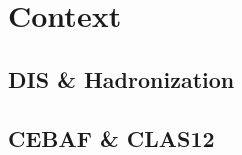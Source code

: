 \section{Context}
\begin{frame}{}
    \centering \Huge{}
\end{frame}

\subsection{DIS \& Hadronization}


\subsection{CEBAF \& CLAS12}

